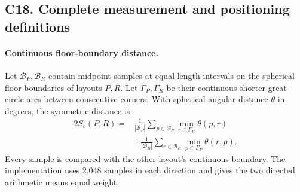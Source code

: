 \subsection*{C18. Complete measurement and positioning definitions}

\paragraph{Continuous floor-boundary distance.}
Let \(\mathcal{B}_P,\mathcal{B}_R\) contain midpoint samples at equal-length intervals on the spherical floor boundaries of layouts \(P,R\). Let \(\Gamma_P,\Gamma_R\) be their continuous shorter great-circle arcs between consecutive corners. With spherical angular distance \(\theta\) in degrees, the symmetric distance is
\begin{equation}
 \begin{aligned}
 2S_b(P,R)={}&\frac{1}{|\mathcal B_P|}\sum_{p\in\mathcal B_P}
 \min_{r\in\Gamma_R}\theta(p,r)\\
 &+\frac{1}{|\mathcal B_R|}\sum_{r\in\mathcal B_R}
 \min_{p\in\Gamma_P}\theta(r,p).
 \end{aligned}
 \label{eq:supp-boundary-distance}
\end{equation}
Every sample is compared with the other layout's continuous boundary. The implementation uses 2,048 samples in each direction and gives the two directed arithmetic means equal weight.

